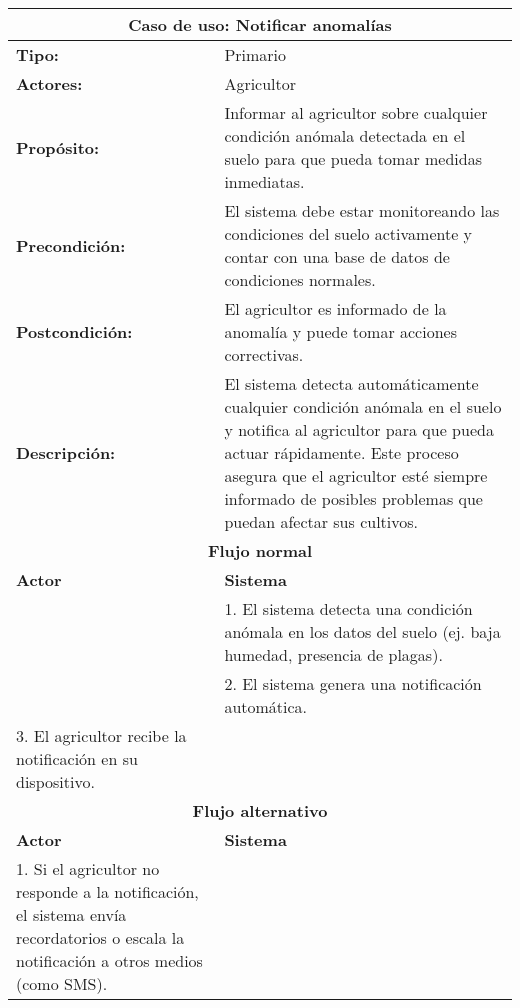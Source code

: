\begin{longtable}{|p{5cm}|p{5cm}|}
	\hline
	\multicolumn{2}{|c|}{\textbf{Caso de uso: Notificar anomalías}} \\
	\hline
	\textbf{Tipo:} & Primario \\
	\hline
	\textbf{Actores:} & Agricultor \\
	\hline
	\textbf{Propósito:} & Informar al agricultor sobre cualquier condición anómala detectada en el suelo para que pueda tomar medidas inmediatas. \\
	\hline
	\textbf{Precondición:} & El sistema debe estar monitoreando las condiciones del suelo activamente y contar con una base de datos de condiciones normales. \\
	\hline
	\textbf{Postcondición:} & El agricultor es informado de la anomalía y puede tomar acciones correctivas. \\
	\hline
	\textbf{Descripción:} & El sistema detecta automáticamente cualquier condición anómala en el suelo y notifica al agricultor para que pueda actuar rápidamente. Este proceso asegura que el agricultor esté siempre informado de posibles problemas que puedan afectar sus cultivos. \\
	\hline
	\multicolumn{2}{|c|}{\textbf{Flujo normal}} \\
	\hline
	\textbf{Actor} & \textbf{Sistema} \\
	\hline
	& 1. El sistema detecta una condición anómala en los datos del suelo (ej. baja humedad, presencia de plagas). \\
	\hline
	& 2. El sistema genera una notificación automática. \\
	\hline
	3. El agricultor recibe la notificación en su dispositivo. & \\
	\hline
	\multicolumn{2}{|c|}{\textbf{Flujo alternativo}} \\
	\hline
	\textbf{Actor} & \textbf{Sistema} \\
	\hline
	1. Si el agricultor no responde a la notificación, el sistema envía recordatorios o escala la notificación a otros medios (como SMS). & \\
	\hline
\end{longtable}

